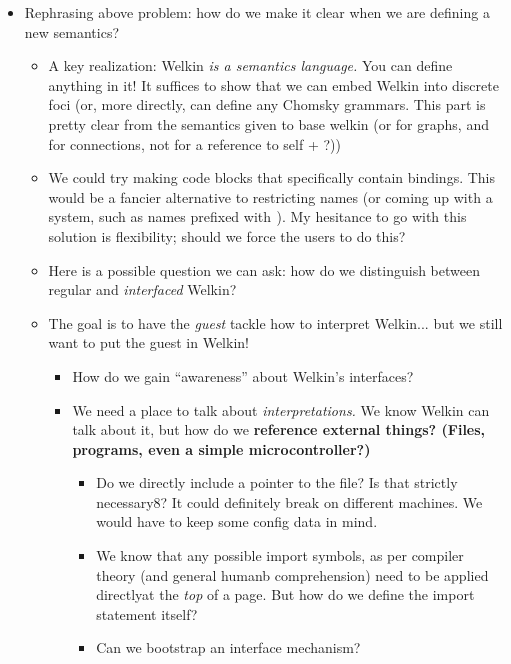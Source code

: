 \begin{itemize}
  \item Rephrasing above problem: how do we make it clear when we are defining a new semantics?
		\begin{itemize}
		  \item A key realization: Welkin \textit{is a semantics language.} You can define anything in it! It suffices to show that we can embed Welkin into discrete foci (or, more directly, can define any Chomsky grammars. This part is pretty clear from the semantics given to base welkin (or for graphs, and for connections, not for a reference to self + ?))
		  \item We could try making code blocks that specifically contain bindings. This would be a fancier alternative to restricting names (or coming up with a system, such as names prefixed with $_{}$). My hesitance to go with this solution is flexibility; should we force the users to do this?
		  \item Here is a possible question we can ask: how do we distinguish between regular and \textit{interfaced} Welkin?
		  \item The goal is to have the \textit{guest} tackle how to interpret Welkin... but we still want to put the guest in Welkin!
				\begin{itemize}
				  \item How do we gain ``awareness'' about Welkin's interfaces?
				  \item We need a place to talk about \textit{interpretations.} We know Welkin can talk about it, but how do we \textbf{reference external things? (Files, programs, even a simple microcontroller?)}
						\begin{itemize}
						  \item Do we directly include a pointer to the file? Is that strictly necessary8? It could definitely break on different machines. We would have to keep some config data in mind.
						  \item We know that any possible import symbols, as per compiler theory (and general humanb comprehension) need to be applied directlyat the \textit{top} of a page. But how do we define the import statement itself?
						  \item Can we bootstrap an interface mechanism?
						\end{itemize}
				\end{itemize}
		\end{itemize}


\end{itemize}
